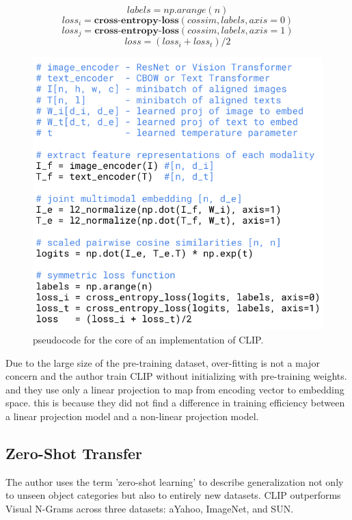\documentclass[extendedabs]{bmvc2k}
\begin{document}
$$
labels = np.arange(n)
$$
$$
loss_i = \textbf{cross-entropy-loss}(cossim, labels,axis=0)
$$
$$
loss_j = \textbf{cross-entropy-loss}(cossim, labels,axis=1)
$$
$$
loss = (loss_i + loss_t)/2
$$

\begin{figure}[t]
\centering
	\includegraphics[width=\linewidth]{images/fig2.PNG}
	\caption{
		 pseudocode for the core of an implementation of CLIP.}
	\vspace{-2mm}
        \label{fig:clipcode}
\end{figure}

Due to the large size of the pre-training dataset, over-fitting is not a major concern and the author train CLIP without initializing with pre-training weights. and they use only a linear projection to map from encoding vector to embedding space. this is because they did not find a difference in training efficiency between a linear projection model and a non-linear projection model.

\subsection{Zero-Shot Transfer}
The author uses the term 'zero-shot learning' to describe generalization not only to unseen object categories but also to entirely new datasets. CLIP outperforms Visual N-Grams across three datasets: aYahoo, ImageNet, and SUN.
\end{document}
